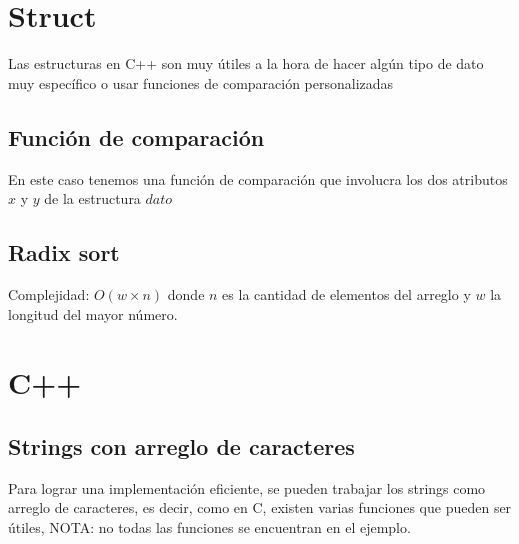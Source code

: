 \documentclass[10pt,letterpaper,twocolumn]{article}
\newcommand{\source}[1]{
	
	\dotfill
}
\begin{document}
	

\section{Struct}
	Las estructuras en C++ son muy útiles a la hora de hacer algún tipo de dato muy específico o usar funciones de comparación personalizadas
	\subsection{Función de comparación}
	En este caso tenemos una función de comparación que involucra los dos atributos $x$ y $y$ de la estructura $dato$
	\source{./src/struct.cpp}
	\subsection{Radix sort}
	Complejidad: $O(w \times n)$ donde $n$ es la cantidad de elementos del arreglo y $w$ la longitud del mayor número.\\
	\source{./src/radixSort.cpp}

\section{C++}
	\subsection{Strings con arreglo de caracteres}
	Para lograr una implementación eficiente, se pueden trabajar los strings como arreglo de caracteres, es decir, como en C, existen varias funciones que pueden ser útiles, NOTA: no todas las funciones se encuentran en el ejemplo.
	\source{./src/getsScanfGetline.cpp}
	
\end{document}
